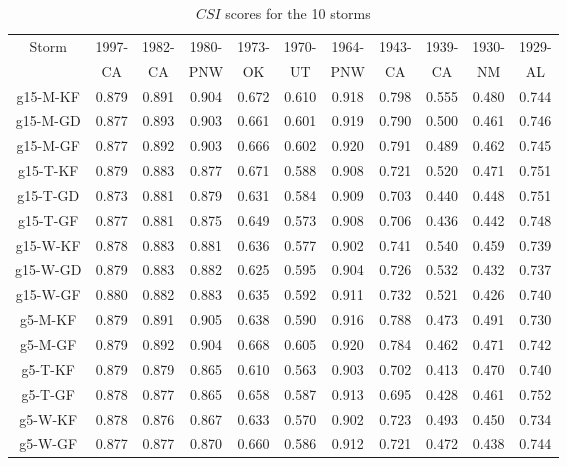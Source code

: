 \begin{table}[htbp]
	\centering
	\caption{$CSI$ scores for the 10 storms}
	\begin{tabular}{ccccccccccc}
		\hline
		\multirow{2}{*}{Storm} & 1997- & 1982- & 1980- & 1973- & 1970- & 1964- & 1943- & 1939- & 1930- & 1929-\\
		& CA & CA & PNW & OK & UT & PNW & CA & CA & NM & AL\\
		\hline
		g15-M-KF & 0.879 & 0.891 & 0.904 & 0.672 & 0.610 & 0.918 & 0.798 & 0.555 & 0.480 & 0.744\\
		g15-M-GD & 0.877 & 0.893 & 0.903 & 0.661 & 0.601 & 0.919 & 0.790 & 0.500 & 0.461 & 0.746\\
		g15-M-GF & 0.877 & 0.892 & 0.903 & 0.666 & 0.602 & 0.920 & 0.791 & 0.489 & 0.462 & 0.745\\
		g15-T-KF & 0.879 & 0.883 & 0.877 & 0.671 & 0.588 & 0.908 & 0.721 & 0.520 & 0.471 & 0.751\\
		g15-T-GD & 0.873 & 0.881 & 0.879 & 0.631 & 0.584 & 0.909 & 0.703 & 0.440 & 0.448 & 0.751\\
		g15-T-GF & 0.877 & 0.881 & 0.875 & 0.649 & 0.573 & 0.908 & 0.706 & 0.436 & 0.442 & 0.748\\
		g15-W-KF & 0.878 & 0.883 & 0.881 & 0.636 & 0.577 & 0.902 & 0.741 & 0.540 & 0.459 & 0.739\\
		g15-W-GD & 0.879 & 0.883 & 0.882 & 0.625 & 0.595 & 0.904 & 0.726 & 0.532 & 0.432 & 0.737\\
		g15-W-GF & 0.880 & 0.882 & 0.883 & 0.635 & 0.592 & 0.911 & 0.732 & 0.521 & 0.426 & 0.740\\
		g5-M-KF & 0.879 & 0.891 & 0.905 & 0.638 & 0.590 & 0.916 & 0.788 & 0.473 & 0.491 & 0.730\\
		g5-M-GF & 0.879 & 0.892 & 0.904 & 0.668 & 0.605 & 0.920 & 0.784 & 0.462 & 0.471 & 0.742\\
		g5-T-KF & 0.879 & 0.879 & 0.865 & 0.610 & 0.563 & 0.903 & 0.702 & 0.413 & 0.470 & 0.740\\
		g5-T-GF & 0.878 & 0.877 & 0.865 & 0.658 & 0.587 & 0.913 & 0.695 & 0.428 & 0.461 & 0.752\\
		g5-W-KF & 0.878 & 0.876 & 0.867 & 0.633 & 0.570 & 0.902 & 0.723 & 0.493 & 0.450 & 0.734\\
		g5-W-GF & 0.877 & 0.877 & 0.870 & 0.660 & 0.586 & 0.912 & 0.721 & 0.472 & 0.438 & 0.744\\
		\hline
	\end{tabular}
	\label{table:3-2}
\end{table}

